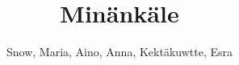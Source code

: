 \documentclass[justified,oneside,notoc]{tufte-book}
\title{Min\"ank\"ale}
\author{Snow, Maria, Aino, Anna, Kekt\"akuwtte, Esra}
\begin{document}
\maketitle

\tableofcontents



%
%
%
%
%
%
%
%
%
%
%
%
\nobibliography{}
\end{document}
